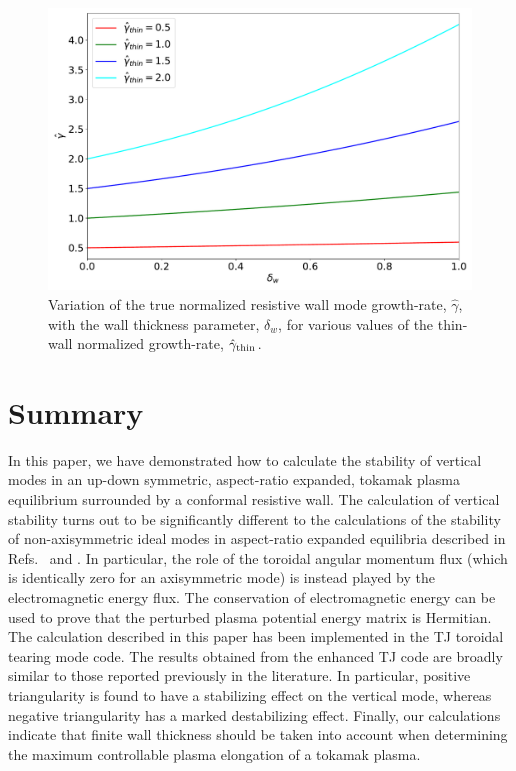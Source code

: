 \documentclass[12pt,prb,aps]{revtex4-1}
\begin{document}
\begin{figure}
\centerline{\includegraphics[width=\textwidth]{Fig8.pdf}}
\caption{Variation of the true  normalized resistive wall  mode growth-rate, $\hat{\gamma}$,  with the wall thickness parameter, $\delta_w$, for various values of the thin-wall normalized growth-rate, $\hat{\gamma}_{\rm thin}$.  \label{fig10}}
\end{figure}

\section{Summary}\label{summary}
In this paper,  we have demonstrated how to calculate the stability of vertical modes in an up-down symmetric, aspect-ratio expanded, tokamak plasma equilibrium surrounded by
a conformal resistive wall. The calculation of vertical stability turns out to be significantly different to the calculations of the stability
of non-axisymmetric ideal modes in aspect-ratio expanded equilibria described in Refs.~ and . In particular, the role of the toroidal angular momentum flux (which is
identically zero for an axisymmetric mode) is instead played by the electromagnetic energy flux. The conservation of electromagnetic energy can be
used to prove that the perturbed plasma potential energy matrix is Hermitian. 
The calculation described in this paper has been implemented in the TJ toroidal tearing mode code. 
The results obtained from the enhanced TJ code are broadly similar to those reported previously in the literature.\cite{f2,guz} In particular, positive triangularity is
found to have a stabilizing effect on the vertical mode, whereas negative triangularity has a marked destabilizing effect. Finally, our calculations indicate that finite wall thickness should be taken into account when
determining the maximum controllable plasma elongation of a tokamak plasma. 
\end{document}
